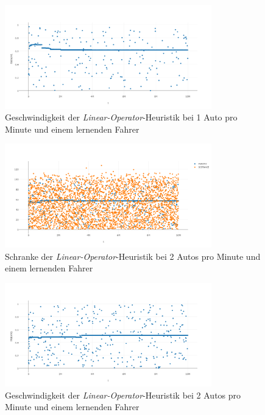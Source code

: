 \begin{figure}[H]
	\includegraphics[width=0.8\textwidth]{analyse/SingleMutant/linopa1.png}
	\caption{Geschwindigkeit der \emph{Linear-Operator}-Heuristik bei 1 Auto pro Minute und einem lernenden Fahrer}\label{fig:ap_sm_loa_1}
\end{figure}
\begin{figure}[H]
	\includegraphics[width=0.8\textwidth]{analyse/SingleMutant/linopzt2.png}
	\caption{Schranke der \emph{Linear-Operator}-Heuristik bei 2 Autos pro Minute und einem lernenden Fahrer}\label{fig:ap_sm_loz_2}
\end{figure}
\begin{figure}[H]
	\includegraphics[width=0.8\textwidth]{analyse/SingleMutant/linopa2.png}
	\caption{Geschwindigkeit der \emph{Linear-Operator}-Heuristik bei 2 Autos pro Minute und einem lernenden Fahrer}\label{fig:ap_sm_loa_2}
\end{figure}
